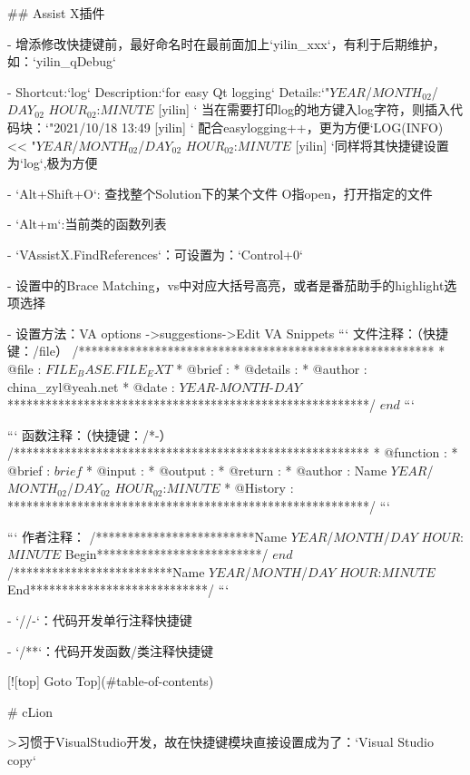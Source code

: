 ## Assist X插件

- 增添修改快捷键前，最好命名时在最前面加上`yilin_xxx`，有利于后期维护，如：`yilin_qDebug`

- Shortcut:`log`
Description:`for easy Qt logging`
Details:`"$YEAR$/$MONTH_02$/$DAY_02$ $HOUR_02$:$MINUTE$ [yilin] `
当在需要打印log的地方键入log字符，则插入代码块：`"2021/10/18 13:49 [yilin] `
配合easylogging++，更为方便`LOG(INFO) << "$YEAR$/$MONTH_02$/$DAY_02$ $HOUR_02$:$MINUTE$ [yilin] `同样将其快捷键设置为`log`,极为方便

- `Alt+Shift+O`: 查找整个Solution下的某个文件 O指open，打开指定的文件

- `Alt+m`:当前类的函数列表

- `VAssistX.FindReferences`：可设置为：`Control+0`

- 设置中的Brace Matching，vs中对应大括号高亮，或者是番茄助手的highlight选项选择

- 设置方法：VA options ->suggestions->Edit VA Snippets
```
文件注释：（快捷键：/file）
/********************************************************
	* @file    : $FILE_BASE$.$FILE_EXT$
	* @brief   :
	* @details :
	* @author  : china_zyl@yeah.net
	* @date    : $YEAR$-$MONTH$-$DAY$
*********************************************************/
$end$
```


```
函数注释：（快捷键：/*-）
/********************************************************
    *  @function :
    *  @brief    :  $brief$
    *  @input    :
    *  @output   :
    *  @return   :
    *  @author   :  Name  $YEAR$/$MONTH_02$/$DAY_02$ $HOUR_02$:$MINUTE$
	*  @History  :
*********************************************************/
```


```
作者注释：
/*************************Name $YEAR$/$MONTH$/$DAY$ $HOUR$:$MINUTE$ Begin**************************/
$end$
/*************************Name $YEAR$/$MONTH$/$DAY$ $HOUR$:$MINUTE$ End****************************/
```

- `//-`：代码开发单行注释快捷键

- `/**`：代码开发函数/类注释快捷键

[![top] Goto Top](#table-of-contents)


# cLion

>习惯于VisualStudio开发，故在快捷键模块直接设置成为了：`Visual Studio copy`

